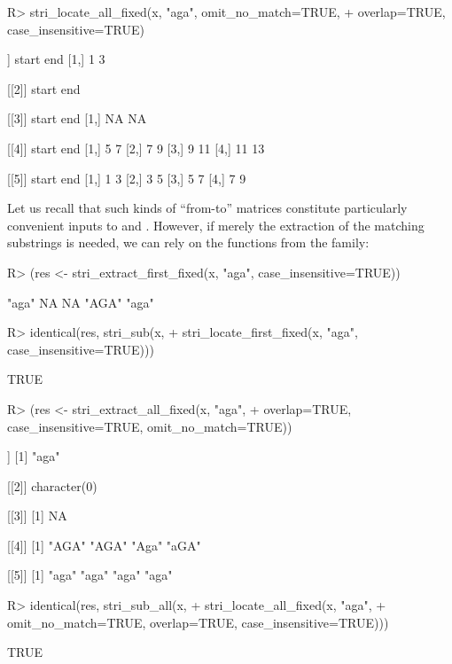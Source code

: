 \documentclass[nojss]{jss}
\begin{document}
\begin{Schunk}
\begin{Sinput}
R> stri_locate_all_fixed(x, "aga", omit_no_match=TRUE,
+      overlap=TRUE, case_insensitive=TRUE)
\end{Sinput}
\begin{Soutput}
[[1]]
     start end
[1,]     1   3

[[2]]
     start end

[[3]]
     start end
[1,]    NA  NA

[[4]]
     start end
[1,]     5   7
[2,]     7   9
[3,]     9  11
[4,]    11  13

[[5]]
     start end
[1,]     1   3
[2,]     3   5
[3,]     5   7
[4,]     7   9
\end{Soutput}
\end{Schunk}



\medskip
Let us recall that such kinds of ``from-to'' matrices constitute particularly
convenient inputs to  and .
However, if merely the extraction of the matching substrings is needed,
we can rely on the functions from the  family:

\begin{Schunk}
\begin{Sinput}
R> (res <- stri_extract_first_fixed(x, "aga", case_insensitive=TRUE))
\end{Sinput}
\begin{Soutput}
[1] "aga" NA    NA    "AGA" "aga"
\end{Soutput}
\begin{Sinput}
R> identical(res, stri_sub(x,
+      stri_locate_first_fixed(x, "aga", case_insensitive=TRUE)))
\end{Sinput}
\begin{Soutput}
[1] TRUE
\end{Soutput}
\begin{Sinput}
R> (res <- stri_extract_all_fixed(x, "aga",
+          overlap=TRUE, case_insensitive=TRUE, omit_no_match=TRUE))
\end{Sinput}
\begin{Soutput}
[[1]]
[1] "aga"

[[2]]
character(0)

[[3]]
[1] NA

[[4]]
[1] "AGA" "AGA" "Aga" "aGA"

[[5]]
[1] "aga" "aga" "aga" "aga"
\end{Soutput}
\begin{Sinput}
R> identical(res, stri_sub_all(x,
+      stri_locate_all_fixed(x, "aga",
+          omit_no_match=TRUE, overlap=TRUE, case_insensitive=TRUE)))
\end{Sinput}
\begin{Soutput}
[1] TRUE
\end{Soutput}
\end{Schunk}
\end{document}
